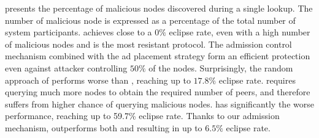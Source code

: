%
%

 presents the percentage of malicious nodes discovered during a single lookup.
The number of malicious node is expressed as a percentage of the total number of system participants. 
\sysname achieves close to a $0\%$ eclipse rate, even with a high number of malicious nodes and is the most resistant protocol.
The admission control mechanism combined with the ad placement strategy form an efficient protection even against attacker controlling $50\%$ of the nodes.
Surprisingly, the random approach of \discv performs worse than \sysname, reaching up to $17.8\%$ eclipse rate. \discv requires querying much more nodes to obtain the required number of peers, and therefore suffers from higher chance of querying malicious nodes.
\altname has  significantly the worse performance, reaching up to 59.7\% eclipse rate.
Thanks to our admission mechanism, \altnameticket outperforms both \discv and \altname resulting in up to $6.5\%$ eclipse rate.
 
